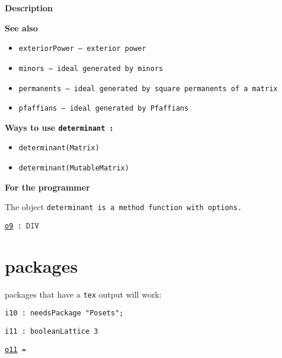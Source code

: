 \documentclass[12pt,a4paper]{amsart}
\begin{document}
\par \medskip\noindent\begingroup\Large\bf
Description\endgroup
\par \smallskip%

\par \medskip\noindent\begingroup\Large\bf
See also\endgroup
\par \smallskip%
\begin{itemize}
\item \begingroup\tt exteriorPower\endgroup{} -- exterior power
\item \begingroup\tt minors\endgroup{} -- ideal generated by minors
\item \begingroup\tt permanents\endgroup{} -- ideal generated by square permanents of a matrix
\item \begingroup\tt pfaffians\endgroup{} -- ideal generated by Pfaffians
\end{itemize}

\par \medskip\noindent\begingroup\Large\bf
Ways to use \begingroup\tt determinant\endgroup{} :\endgroup
\par \smallskip%
\begin{itemize}
\item \begingroup\tt {}determinant(Matrix){}\endgroup{}
\item \begingroup\tt {}determinant(MutableMatrix){}\endgroup{}
\end{itemize}

\par \medskip\noindent\begingroup\Large\bf
For the programmer\endgroup
\par \smallskip%

\par The object \begingroup\tt determinant\endgroup{} is a \begingroup\tt method\ function\ with\ options\endgroup{}.

\noindent\underline{\tt o9}\verb| : |$\texttt{DIV}$
\smallskip


\section{packages}
packages that have a {\tt tex} output will work:
\smallskip
\begin{verbatim}
i10 : needsPackage "Posets";
\end{verbatim}
\begin{verbatim}
i11 : booleanLattice 3
\end{verbatim}
\noindent\underline{\tt o11}\verb| = |
\end{document}
